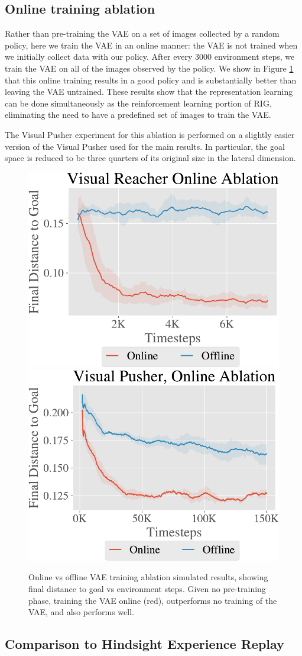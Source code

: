 \subsection{Online training ablation} \label{sec:appendix_online}
Rather than pre-training the VAE on a set of images collected by a random policy, here we train the VAE in an online manner: the VAE is not trained when we initially collect data with our policy.
After every 3000 environment steps, we train the VAE on all of the images observed by the policy.
We show in Figure \ref{fig:online-ablation-all-envs} that this online training results in a good policy and is substantially better than leaving the VAE untrained.
These results show that the representation learning can be done simultaneously as the reinforcement learning portion of RIG, eliminating the need to have a predefined set of images to train the VAE.

The Visual Pusher experiment for this ablation is performed on a slightly easier version of the Visual Pusher used for the main results.
In particular, the goal space is reduced to be three quarters of its original size in the lateral dimension.

\begin{figure}[h]
    \centering
    \includegraphics[height=0.2\linewidth]{img/reacher_online_ablation.pdf}
    \includegraphics[height=0.2\linewidth]{img/pusher_online_ablation.pdf}
    \caption{Online vs offline VAE training ablation simulated results, showing final distance to goal vs environment steps. Given no pre-training phase, training the VAE online (red), outperforms no training of the VAE, and also performs well.}
    \vspace{-0.1in}
    \label{fig:online-ablation-all-envs}
\end{figure}

\subsection{Comparison to Hindsight Experience Replay} \label{sec:her_relabeling_ablation}


